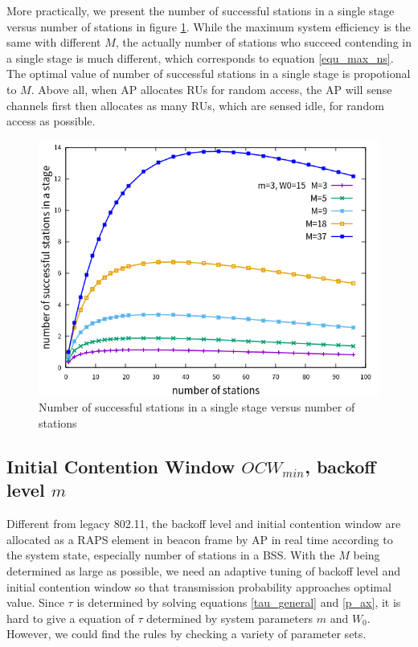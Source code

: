 More practically, we present the number of successful stations in a single stage versus number of stations in figure \ref{fig_n_M_ns}.
While the maximum system efficiency is the same with different $M$, the actually number of stations who succeed contending in a single stage is much different, which corresponds to equation \ref{equ_max_ns}. 
The optimal value of number of successful stations in a single stage is propotional to $M$. 
Above all, when AP allocates RUs for random access, the AP will sense channels first then allocates as many RUs, which are sensed idle, for random access as possible.

\begin{figure}[!ht]
\includegraphics[scale=.54]{./figure/n_M_ns_perf.png}
\caption{Number of successful stations in a single stage versus number of stations}
\label{fig_n_M_ns}
\end{figure}

\subsection{Initial Contention Window $OCW_{min}$, backoff level $m$}
Different from legacy 802.11, the backoff level and initial contention window are allocated as a RAPS element in beacon frame by AP in real time according to the system state, especially number of stations in a BSS.
With the $M$ being determined as large as possible, we need an adaptive tuning of backoff level and initial contention window so that transmission probability approaches optimal value.
Since $\tau$ is determined by solving equations \ref{tau_general} and \ref{p_ax}, it is hard to give a equation of $\tau$ determined by system parameters $m$ and $W_0$.
However, we could find the rules by checking a variety of parameter sets.

